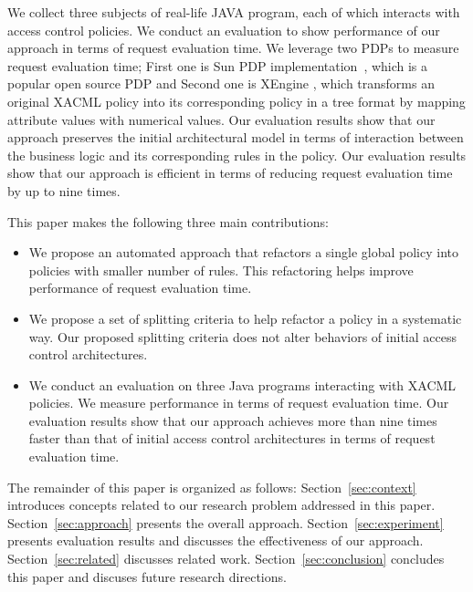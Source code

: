 
We collect three subjects of real-life JAVA program, each of which interacts
with access control policies. 
We conduct an evaluation to show performance of our approach in terms of request evaluation time.
We leverage two PDPs to measure request evaluation time; First one is
Sun PDP implementation~\cite{oasis}, which is a popular open source PDP and Second one is 
XEngine \cite{Xengine}, which transforms an original XACML policy
into its corresponding policy in a tree format by mapping attribute values with numerical values.
Our evaluation results show that our approach preserves the initial architectural model in terms of interaction between the business logic and its corresponding
rules in the policy. Our evaluation results show that our approach is efficient in terms of reducing request evaluation time by up to nine times. 



This paper makes the following three main contributions:
\begin{itemize}
\item We propose an automated approach that refactors a single global policy into policies with smaller number of rules. This
refactoring helps improve performance of request evaluation time.
\item We propose a set of splitting criteria to help refactor a policy in a systematic way. Our proposed splitting criteria does not alter behaviors of initial access control architectures.
\item We conduct an evaluation on three Java programs interacting with XACML policies. We measure performance in terms
of request evaluation time. 
Our evaluation results show that our approach achieves more than nine times faster than that of initial access control architectures in terms of request evaluation time.
\end{itemize}


The remainder of this paper is organized as follows: Section~\ref{sec:context} introduces concepts related to our research problem addressed in this paper.
Section~\ref{sec:approach} presents the overall approach. 
Section~\ref{sec:experiment} presents evaluation results and discusses the effectiveness of our approach. Section~\ref{sec:related} discusses related work.
Section~\ref{sec:conclusion} concludes this paper and discuses future research directions.

